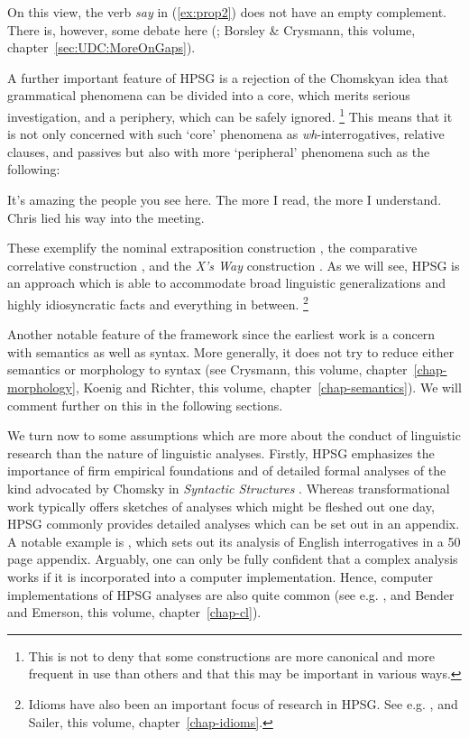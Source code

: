 \documentclass[output=paper
	        ,collection
	        ,collectionchapter
 	        ,biblatex
                ,babelshorthands
                ,newtxmath
                ,draftmode
                ,colorlinks, citecolor=brown
]{langscibook}
\begin{document}
On this view, the verb \emph{say} in (\ref{ex:prop2}) does not have an empty complement. There is, however, some debate here (\citealp{SF94a,Mueller2004e}; Borsley \& Crysmann, this volume, chapter~\ref{sec:UDC:MoreOnGaps}).

{\color{red}
A further important feature of HPSG is a rejection of the Chomskyan idea that grammatical phenomena can be divided into a core, which merits serious investigation, and a periphery, which can be safely ignored.%
%
\footnote{This is not to deny that some constructions are more canonical and more frequent in use than others and that this may be important in various ways.}
%
This means that it is not only concerned with such ‘core’ phenomena as \emph{wh}-interrogatives, relative clauses, and passives but also with more ‘peripheral’ phenomena such as the following:
}

\ea\label{ex:prop3}
	\ea\label{ex:prop3a}
	It’s amazing the people you see here.
	\ex\label{ex:prop3b}
	The more I read, the more I understand.
	\ex\label{ex:prop3c}
	Chris lied his way into the meeting.
	\z
\z

These exemplify the nominal extraposition construction \citep{MichaelisLambrecht1996}, the comparative correlative construction \citep{Abeille2006a,AB2008a-u,Borsley2011a-u}, and the \emph{X’s Way} construction \citep[7.4]{KF99a,Sag2012a}. As we will see, HPSG is an approach which is able to accommodate broad linguistic generalizations and highly idiosyncratic facts and everything in between.%
%
\footnote{Idioms have also been an important focus of research in HPSG. See e.g. \citealt{RS2009a,KM2019a}, and Sailer, this volume, chapter~\ref{chap-idioms}.}
%

Another notable feature of the framework since the earliest work is a concern with semantics as well as syntax. More generally, it does not try to reduce either semantics or morphology to syntax (see Crysmann, this volume, chapter~\ref{chap-morphology}, Koenig and Richter, this volume, chapter~\ref{chap-semantics}). We will comment further on this in the following sections.

We turn now to some assumptions which are more about the conduct of linguistic research than the nature of linguistic analyses. Firstly, HPSG emphasizes the importance of firm empirical foundations and of detailed formal analyses of the kind advocated by Chomsky in \emph{Syntactic Structures} \citep{Chomsky57a}. Whereas transformational work typically offers sketches of analyses which might be fleshed out one day, HPSG commonly provides detailed analyses which can be set out in an appendix. A notable example is \citet{GSag2000a-u}, which sets out its analysis of English interrogatives in a 50 page appendix. Arguably, one can only be fully confident that a complex analysis works if it is incorporated into a computer implementation. Hence, computer implementations of HPSG analyses are also quite common (see e.g. \citealp{Babel,MuellerCoreGram,Copestake2002a,BDFPS2010a-u,Bender2016}, and Bender and Emerson, this volume, chapter~\ref{chap-cl}).
\end{document}

